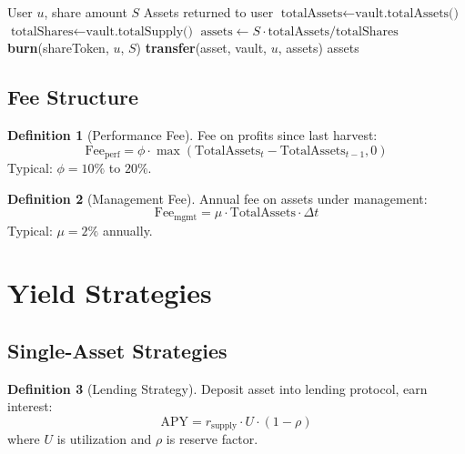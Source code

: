 \documentclass[11pt,a4paper]{article}
\theoremstyle{definition}
\newtheorem{definition}{Definition}
\begin{document}
\begin{algorithm}
\caption{Withdraw from Vault}
\begin{algorithmic}[1]
\Require User $u$, share amount $S$
\Ensure Assets returned to user
\State $\text{totalAssets} \gets \text{vault.totalAssets()}$
\State $\text{totalShares} \gets \text{vault.totalSupply()}$
\State $\text{assets} \gets S \cdot \text{totalAssets} / \text{totalShares}$
\State \textbf{burn}(shareToken, $u$, $S$)
\State \textbf{transfer}(asset, vault, $u$, assets)
\State \Return assets
\end{algorithmic}
\end{algorithm}

\subsection{Fee Structure}

\begin{definition}[Performance Fee]
Fee on profits since last harvest:
\begin{equation}
\text{Fee}_{\text{perf}} = \phi \cdot \max(\text{TotalAssets}_t - \text{TotalAssets}_{t-1}, 0)
\end{equation}
Typical: $\phi = 10\%$ to $20\%$.
\end{definition}

\begin{definition}[Management Fee]
Annual fee on assets under management:
\begin{equation}
\text{Fee}_{\text{mgmt}} = \mu \cdot \text{TotalAssets} \cdot \Delta t
\end{equation}
Typical: $\mu = 2\%$ annually.
\end{definition}

\section{Yield Strategies}

\subsection{Single-Asset Strategies}

\begin{definition}[Lending Strategy]
Deposit asset into lending protocol, earn interest:
\begin{equation}
\text{APY} = r_{\text{supply}} \cdot U \cdot (1 - \rho)
\end{equation}
where $U$ is utilization and $\rho$ is reserve factor.
\end{definition}
\end{document}
